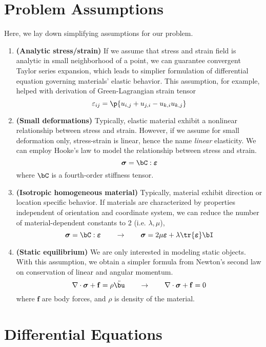 \documentclass[11pt]{article}
\newcommand{\bheading}[1]{\textbf{(#1)}}
\newcommand{\bsigma}{\boldsymbol{\sigma}}
\newcommand{\bepsilon}{\boldsymbol{\varepsilon}}
\renewcommand{\epsilon}{\varepsilon}
\renewcommand{\bf}{\mathbf{f}}
\begin{document}
\section*{Problem Assumptions}

Here, we lay down simplifying assumptions for our problem.
\begin{enumerate}
    \item \bheading{Analytic stress/strain} If we assume that stress and strain field is analytic in small neighborhood of a point, we can guarantee convergent Taylor series expansion, which leads to simplier formulation of differential equation governing materials' elastic behavior. This assumption, for example, helped with derivation of Green-Lagrangian strain tensor
    \[
        \epsilon_{ij} = \p{u_{i,j} + u_{j,i} - u_{k,i}u_{k,j}}    
    \]
    \item \bheading{Small deformations} Typically, elastic material exhibit a nonlinear relationship between stress and strain. However, if we assume for small deformation only, stress-strain is linear, hence the name \textit{linear} elasticity. We can employ Hooke's law to model the relationship between stress and strain.
    \[
        \bsigma = \bC : \bepsilon
    \]
    where $\bC$ is a fourth-order stiffness tensor.
    \item \bheading{Isotropic homogeneous material} Typically, material exhibit direction or location specific behavior. If materials are characterized by properties independent of orientation and coordinate system, we can reduce the number of material-dependent constants to 2 (i.e. $\lambda,\mu$),
    \[
        \bsigma = \bC : \bepsilon
        \quad \quad \rightarrow \quad \quad
        \bsigma = 2\mu\bepsilon + \lambda \tr{\bepsilon} \bI
    \]
    \item \bheading{Static equilibrium} We are only interested in modeling static objects. With this assumption, we obtain a simpler formula from Newton's second law on conservation of linear and angular momentum.
    \[
        \nabla\cdot\bsigma + \bf = \rho \ddot{\bu}
        \quad \quad \rightarrow \quad \quad
        \nabla\cdot\bsigma + \bf = 0
    \]
    where $\bf$ are body forces, and $\rho$ is density of the material.
\end{enumerate}


\section*{Differential Equations}
\end{document}
